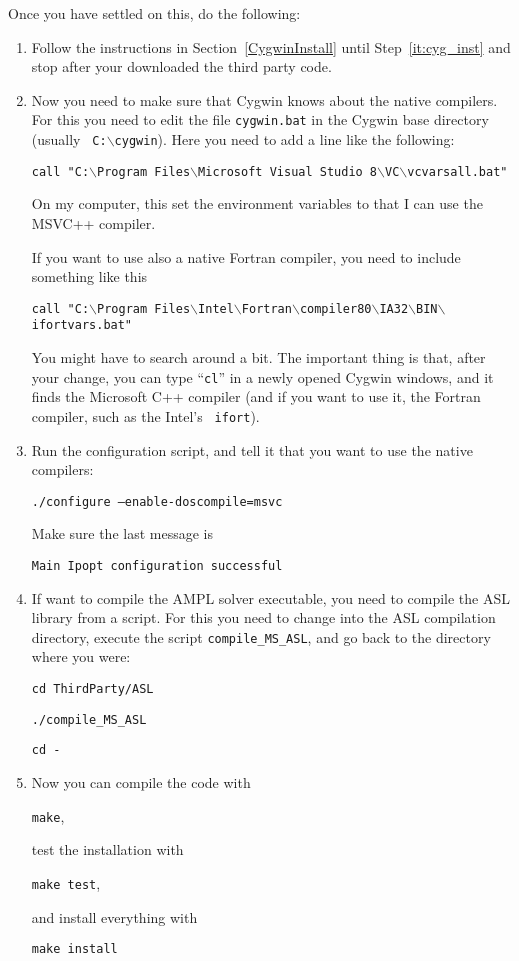 \documentclass[10pt]{article}
\begin{document}
\noindent
Once you have settled on this, do the following:

\begin{enumerate}
\item Follow the instructions in Section~\ref{CygwinInstall} until
  Step~\ref{it:cyg_inst} and stop after your downloaded the third
  party code.

\item\label{it:setupmsvcpath} Now you need to make sure that Cygwin
  knows about the native compilers.  For this you need to edit the
  file {\tt cygwin.bat} in the Cygwin base directory (usually {\tt
    C:$\backslash$cygwin}).  Here you need to add a line like the
  following:

  \texttt{call "C:$\backslash$Program Files$\backslash$Microsoft Visual
    Studio 8$\backslash$VC$\backslash$vcvarsall.bat"}

  On my computer, this set the environment variables to that I can use
  the MSVC++ compiler.

  If you want to use also a native Fortran compiler, you need to
  include something like this

  \texttt{call "C:$\backslash$Program
    Files$\backslash$Intel$\backslash$Fortran$\backslash$compiler80$\backslash$IA32$\backslash$BIN$\backslash$ifortvars.bat"}

  You might have to search around a bit.  The important thing is that,
  after your change, you can type ``{\tt cl}'' in a newly opened
  Cygwin windows, and it finds the Microsoft C++ compiler (and if you
  want to use it, the Fortran compiler, such as the Intel's {\tt
    ifort}).

\item Run the configuration script, and tell it that you want to use
  the native compilers:

  \texttt{./configure --enable-doscompile=msvc}

  Make sure the last message is

  \texttt{Main Ipopt configuration successful}

\item\label{it:ASLcompile} If want to compile the AMPL solver
  executable, you need to compile the ASL library from a script.  For
  this you need to change into the ASL compilation directory, execute
  the script \texttt{compile\_MS\_ASL}, and go back to the directory
  where you were:

  \texttt{cd ThirdParty/ASL}

  \texttt{./compile\_MS\_ASL}

  \texttt{cd -}

\item Now you can compile the code with

  \texttt{make},

  test the installation with

  \texttt{make test},

  and install everything with

  \texttt{make install}
\end{enumerate}
\end{document}
